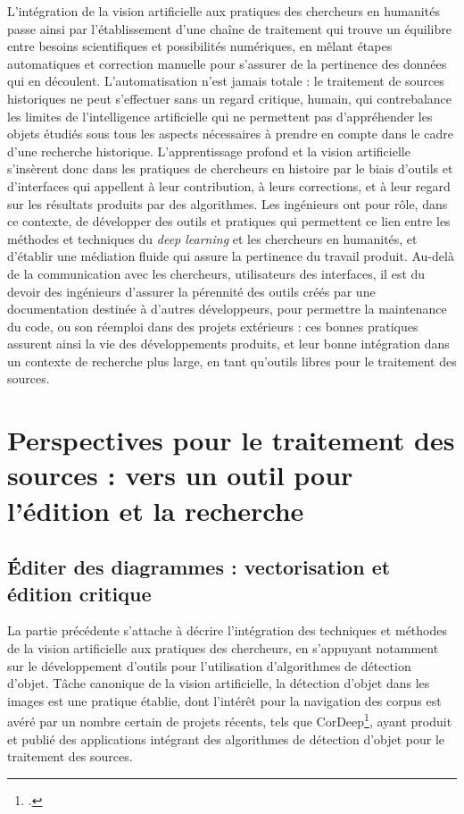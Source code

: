 \documentclass[a4paper,12pt,twoside]{book}
\newcommand{\dl}{\textit{deep learning}\xspace}
\newcommand{\ia}{intelligence artificielle\xspace}
\newcommand{\clearemptydoublepage}{\newpage{\pagestyle{empty}\cleardoublepage}}
\begin{document}
        L'intégration de la vision artificielle aux pratiques des chercheurs en humanités passe ainsi par l'établissement d'une chaîne de traitement qui trouve un équilibre entre besoins scientifiques et possibilités numériques, en mêlant étapes automatiques et correction manuelle pour s'assurer de la pertinence des données qui en découlent. L'automatisation n'est jamais totale : le traitement de sources historiques ne peut s'effectuer sans un regard critique, humain, qui contrebalance les limites de l'\ia qui ne permettent pas d'appréhender les objets étudiés sous tous les aspects nécessaires à prendre en compte dans le cadre d'une recherche historique. L'apprentissage profond et la vision artificielle s'insèrent donc dans les pratiques de chercheurs en histoire par le biais d'outils et d'interfaces qui appellent à leur contribution, à leurs corrections, et à leur regard sur les résultats produits par des algorithmes. Les ingénieurs ont pour rôle, dans ce contexte, de développer des outils et pratiques qui permettent ce lien entre les méthodes et techniques du \dl et les chercheurs en humanités, et d'établir une médiation fluide qui assure la pertinence du travail produit. Au-delà de la communication avec les chercheurs, utilisateurs des interfaces, il est du devoir des ingénieurs d'assurer la pérennité des outils créés par une documentation destinée à d'autres développeurs, pour permettre la maintenance du code, ou son réemploi dans des projets extérieurs : ces bonnes pratiques assurent ainsi la vie des développements produits, et leur bonne intégration dans un contexte de recherche plus large, en tant qu'outils libres pour le traitement des sources.
        \clearemptydoublepage

    \part{Perspectives pour le traitement des sources : vers un outil pour l’édition et la recherche}
        \chapter[Éditer des diagrammes]{Éditer des diagrammes : vectorisation et édition critique}
        La partie précédente s'attache à décrire l'intégration des techniques et méthodes de la vision artificielle aux pratiques des chercheurs, en s'appuyant notamment sur le développement d'outils pour l'utilisation d'algorithmes de détection d'objet. Tâche canonique de la vision artificielle, la détection d'objet dans les images est une pratique établie, dont l'intérêt pour la navigation des corpus est avéré par un nombre certain de projets récents, tels que CorDeep\footcite{CorDeep}, ayant produit et publié des applications intégrant des algorithmes de détection d'objet pour le traitement des sources.
        
\end{document}

